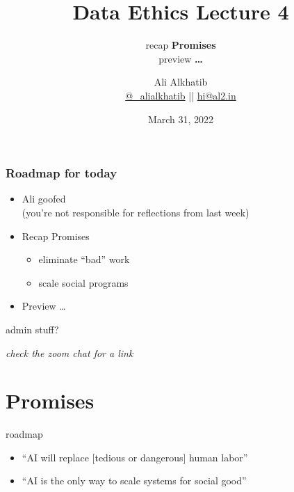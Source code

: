\documentclass[aspectratio=43,17pt]{beamer} %
\title{Data Ethics Lecture 4}
\subtitle{recap {\bfseries Promises}\\preview {\bfseries \dots}}
\author[Ali Alkhatib]{{Ali Alkhatib}\\
\href{http://twitter.com/_alialkhatib}{@\_alialkhatib} || \href{mailto:hi@al2.in}{hi@al2.in}}
\date{March 31, 2022}
\newcommand{\onlyinsubfile}[1]{#1}
\newcommand{\notinsubfile}[1]{}
\begin{document}
\renewcommand{\onlyinsubfile}[1]{}
\renewcommand{\notinsubfile}[1]{#1}


\begin{frame}
\titlepage
\end{frame}

\begin{frame}[t]\frametitle{Roadmap for today}

\begin{itemize}
    \item Ali goofed
    {\small\\(you're not responsible for reflections from last week)}
    \item Recap Promises
    \begin{itemize}
        \item eliminate ``bad'' work
        \item scale social programs
    \end{itemize}
    \item Preview \dots
\end{itemize}

\end{frame}

\begin{frame}{admin stuff?}
    
    \begin{itemize}
    \end{itemize}

\end{frame}


\begin{frame}[plain]

\centering
\emph{check the zoom chat for a link}

\end{frame}


\section{Promises}


\begin{frame}{roadmap}
\begin{itemize}
    \item ``AI will replace [tedious or dangerous] human labor''
    \item ``AI is the only way to scale systems for social good''
\end{itemize}

\end{frame}
\end{document}
